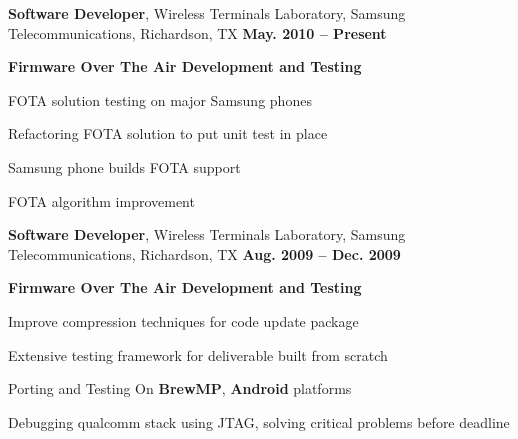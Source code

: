 \documentclass[overlapped, line]{resume}
\begin{document}
\begin{resume}
         {\bf Software Developer}, Wireless Terminals Laboratory, Samsung Telecommunications, Richardson, TX \hfill {\bf May. 2010 -- Present}\\
         \vspace{-10pt}      %
         \begin{list2}
         \item \textbf{Firmware Over The Air Development and Testing}
           \begin{list2}
           \item FOTA solution testing on major Samsung phones
           \item Refactoring FOTA solution to put unit test in place
           \item Samsung phone builds FOTA support
           \item FOTA algorithm improvement
           \item 
           \end{list2}
         \end{list2}  \vspace{-5pt}

         {\bf Software Developer}, Wireless Terminals Laboratory, Samsung Telecommunications, Richardson, TX \hfill {\bf Aug. 2009 -- Dec. 2009}\\
         \vspace{-10pt}      %
         \begin{list2}
         \item \textbf{Firmware Over The Air Development and Testing}
           \begin{list2}
           \item Improve compression techniques for code update package
           \item Extensive testing framework for deliverable built from scratch
           \item Porting and Testing On \textbf{BrewMP}, \textbf{Android} platforms
           \item Debugging qualcomm stack using JTAG, solving critical problems before deadline
           \item 
           \end{list2}

         \end{list2}  \vspace{-5pt}



\end{resume}
\end{document}
